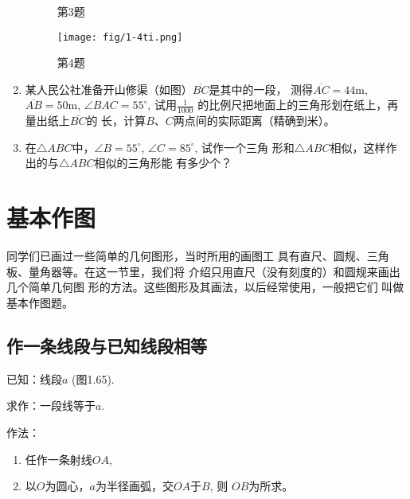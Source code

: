 \begin{enumerate}
\begin{figure}[htp]
\begin{minipage}[t]{0.48\textwidth}
    \caption*{第3题}
    \end{minipage}
    \begin{minipage}[t]{0.48\textwidth}
    \centering
\texttt{[image: fig/1-4ti.png]}
    \caption*{第4题}
    \end{minipage}
    \end{figure}

\item 某人民公社准备开山修渠（如图）$\overline{BC}$是其中的一段，
测得$\overline{AC}=44$m, $\overline{AB}=50$m, $\angle BAC=55^{\circ}$, 试用$\frac{1}{1000}$
的比例尺把地面上的三角形划在纸上，再量出纸上$\overline{BC}$的
长，计算$B$、$C$两点间的实际距离（精确到米）。

\item 在$\triangle ABC$中，$\angle B=55^{\circ}$, $\angle C=85^{\circ}$, 试作一个三角
形和$\triangle ABC$相似，这样作出的与$\triangle ABC$相似的三角形能
有多少个？
\end{enumerate}

\section{基本作图}
同学们已画过一些简单的几何图形，当时所用的画图工
具有直尺、圆规、三角板、量角器等。在这一节里，我们将
介绍只用直尺（没有刻度的）和圆规来画出几个简单几何图
形的方法。这些图形及其画法，以后经常使用，一般把它们
叫做基本作图题。

\subsection{作一条线段与已知线段相等}
已知：线段$a$ (图1.65).

求作：一段线等于$a$.
\begin{figure}[htp]
	\centering
{}
	\caption{}
\end{figure}


作法：
\begin{enumerate}
\item 任作一条射线$OA$,
\item 以$O$为圆心，$a$为半径画弧，交$OA$于$B$, 则
$OB$为所求。
\end{enumerate}




